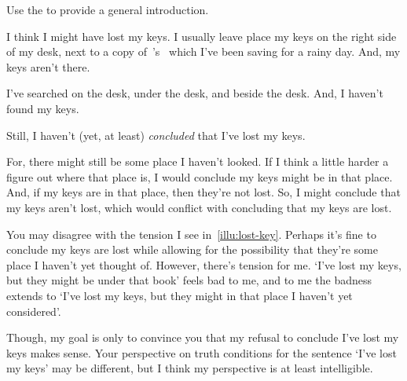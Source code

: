 \begin{note}
  Use the \illu{} to provide a general introduction.
\end{note}

\begin{note}
  \begin{scenario}
    \label{illu:lost-key}
    I think I might have lost my keys.
    I usually leave place my keys on the right side of my desk, next to a copy of~\citeauthor{Vickers:1989tr}'s~ which I've been saving for a rainy day.
    And, my keys aren't there.

    I've searched on the desk, under the desk, and beside the desk.
    And, I haven't found my keys.

    Still, I haven't (yet, at least) \emph{concluded} that I've lost my keys.

    For, there might still be some place I haven't looked.
    If I think a little harder a figure out where that place is, I would conclude my keys might be in that place.
    And, if my keys are in that place, then they're not lost.
    So, I might conclude that my keys aren't lost, which would conflict with concluding that my keys are lost.
  \end{scenario}

  You may disagree with the tension I see in~\autoref{illu:lost-key}.
  Perhaps it's fine to conclude my keys are lost while allowing for the possibility that they're some place I haven't yet thought of.
  However, there's tension for me.
  `I've lost my keys, but they might be under that book' feels bad to me, and to me the badness extends to `I've lost my keys, but they might in that place I haven't yet considered'.

  Though, my goal is only to convince you that my refusal to conclude I've lost my keys makes sense.
  Your perspective on truth conditions for the sentence `I've lost my keys' may be different, but I think my perspective is at least intelligible.
\end{note}

